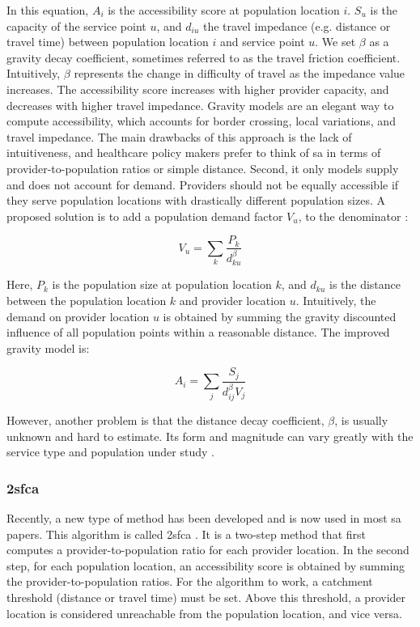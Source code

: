 In this equation, $A_i$ is the accessibility score at population location $i$.
$S_u$ is the capacity of the service point $u$, and $d_{iu}$ the travel
impedance (e.g. distance or travel time) between population location $i$ and
service point $u$. We set $\beta$ as a gravity decay coefficient, sometimes
referred to as the travel friction coefficient. Intuitively, $\beta$ represents
the change in difficulty of travel as the impedance value increases. The
accessibility score increases with higher provider capacity, and decreases with
higher travel impedance. Gravity models are an elegant way to compute
accessibility, which accounts for border crossing, local variations, and travel
impedance. The main drawbacks of this approach is the lack of intuitiveness, and
healthcare policy makers prefer to think of \ac{sa} in terms of
provider-to-population ratios or simple distance. Second, it only models supply
and does not account for demand. Providers should not be equally accessible if
they serve population locations with drastically different population sizes. A
proposed solution is to add a population demand factor $V_u$, to the denominator
\cite{joseph_measuring_1982}:

\begin{equation}
    V_u = \sum_k \frac{P_k}{d_{ku}^{\beta}}
\end{equation}

Here, $P_k$ is the population size at population location $k$, and $d_{ku}$ is
the distance between the population location $k$ and provider location $u$.
Intuitively, the demand on provider location $u$ is obtained by summing the
gravity discounted influence of all population points within a reasonable
distance. The improved gravity model is:

\begin{equation}
    A_i = \sum_j \frac{S_j}{d_{ij}^{\beta} V_j}
\end{equation}

However, another problem is that the distance decay coefficient, $\beta$, is
usually unknown and hard to estimate. Its form and magnitude can vary greatly
with the service type and population under study \cite{talen_assessing_1998}.

\subsubsection{\acf{2sfca}}

Recently, a new type of method has been developed and is now used in most
\ac{sa} papers. This algorithm is called \acf{2sfca} \cite{luo_using_2004}. It is
a two-step method that first computes a provider-to-population ratio for each
provider location. In the second step, for each population location, an
accessibility score is obtained by summing the provider-to-population ratios.
For the algorithm to work, a catchment threshold (distance or travel time) must
be set. Above this threshold, a provider location is considered unreachable from
the population location, and vice versa.

